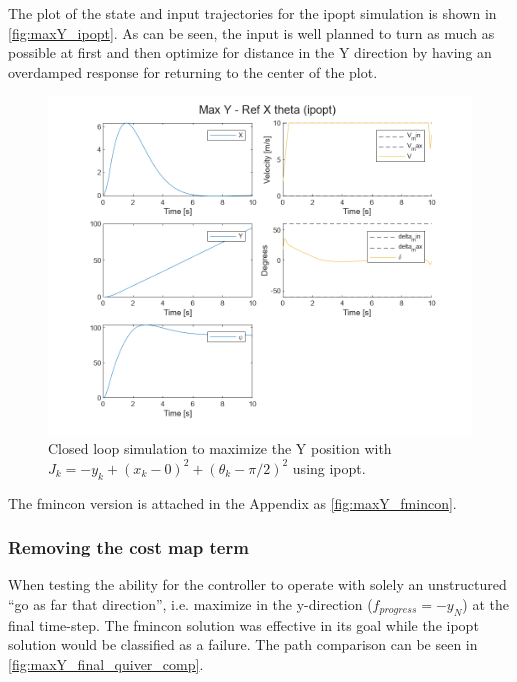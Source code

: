 \documentclass[]{IEEEtran}
\begin{document}
The plot of the state and input trajectories for the ipopt simulation is shown in \autoref{fig:maxY_ipopt}.
As can be seen, the input is well planned to turn as much as possible at first and then optimize for distance in the Y direction by having an overdamped response for returning to the center of the plot.
\begin{figure}[h]
    \centering
    \includegraphics[width = \columnwidth]{figs/Max_Y_-_Ref_X_theta_(ipopt)_traj.png}
    \caption{Closed loop simulation to maximize the Y position with $J_k = -y_k + (x_k - 0)^2 + (\theta_k - \pi/2)^2$ using ipopt.}\label{fig:maxY_ipopt}
\end{figure}
The fmincon version is attached in the Appendix as \autoref{fig:maxY_fmincon}.

\subsubsection{Removing the cost map term}
When testing the ability for the controller to operate with solely an unstructured ``go as far that direction'', i.e. maximize in the y-direction ($f_{progress} = -y_N$) at the final time-step.
The fmincon solution was effective in its goal while the ipopt solution would be classified as a failure.
The path comparison can be seen in \autoref{fig:maxY_final_quiver_comp}. 
\end{document}
